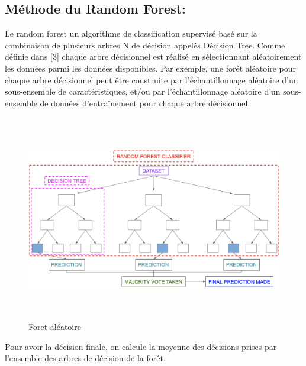 \subsection{Méthode du Random Forest:}
Le random forest un algorithme de classification supervisé basé sur la combinaison de plusieurs arbres N de décision appelés Décision Tree. Comme définie dans [3]  chaque arbre décisionnel est réalisé en sélectionnant aléatoirement les données parmi les données disponibles. Par exemple, une forêt aléatoire pour chaque arbre décisionnel peut être construite par l'échantillonnage aléatoire d'un sous-ensemble de caractéristiques, et/ou par l'échantillonnage aléatoire d'un sous-ensemble de données d'entraînement pour chaque arbre décisionnel.
\begin{figure}[h]
\begin{center}
\includegraphics[width=15cm,height=9cm]{images/random-forest-classifier.png}
\caption[Foret aléatoire]{Foret aléatoire}
\label{monlabel}
\end{center}
\end{figure}
Pour avoir la décision finale, on calcule la moyenne des décisions prises par l’ensemble des arbres de décision de la forêt.
\newpage



